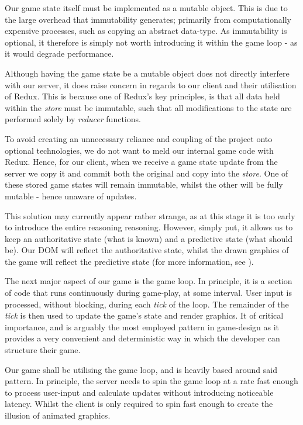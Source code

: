 \documentclass{standalone}
\begin{document}
		Our game state itself must be implemented as a mutable object. This is due to the large overhead that immutability generates; primarily from computationally expensive processes, such as copying an abstract data-type. As immutability is optional, it therefore is simply not worth introducing it within the game loop - as it would degrade performance.

		Although having the game state be a mutable object does not directly interfere with our server, it does raise concern in regards to our client and their utilisation of Redux. This is because one of Redux's key principles, is that all data held within the \emph{store} must be immutable, such that all modifications to the state are performed solely by \emph{reducer} functions.

		To avoid creating an unnecessary reliance and coupling of the project onto optional technologies, we do not want to meld our internal game code with Redux. Hence, for our client, when we receive a game state update from the server we copy it and commit both the original and copy into the \emph{store}. One of these stored game states will remain immutable, whilst the other will be fully mutable - hence unaware of updates.

		This solution may currently appear rather strange, as at this stage it is too early to introduce the entire reasoning reasoning. However, simply put, it allows us to keep an authoritative state (what is known) and a predictive state (what should be). Our DOM will reflect the authoritative state, whilst the drawn graphics of the game will reflect the predictive state (for more information, see ).

		The next major aspect of our game is the game loop. In principle, it is a section of code that runs continuously during game-play, at some interval. User input is processed, without blocking, during each \emph{tick} of the loop. The remainder of the \emph{tick} is then used to update the game's state and render graphics. It of critical importance, and is arguably the most employed pattern in game-design as it provides a very convenient and deterministic way in which the developer can structure their game.

		Our game shall be utilising the game loop, and is heavily based around said pattern. In principle, the server needs to spin the game loop at a rate fast enough to process user-input and calculate updates without introducing noticeable latency. Whilst the client is only required to spin fast enough to create the illusion of animated graphics.
\end{document}

